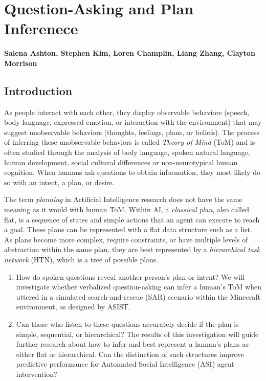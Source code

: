 \chapter{Question-Asking and Plan Inferenece}
\label{ch:question_plan}
\textbf{Salena Ashton, Stephen Kim, Loren Champlin, Liang Zhang, Clayton Morrison}

\section{Introduction}

As people interact with each other, they display observable behaviors (speech,
body language, expressed emotion, or interaction with the environment) that may
suggest unobservable behaviors (thoughts, feelings, plans, or beliefs). The
process of inferring these unobservable behaviors is called \textit{Theory of
Mind} (ToM) and is often studied through the analysis of body language, spoken natural language, human development, social cultural differences or non-neurotypical human cognition. When humans ask questions to obtain information, they most likely do so with an intent, a plan, or desire.

The term \textit{planning} in Artificial Intelligence research does not have
the same meaning as it would with human ToM. Within AI, a \textit{classical
plan}, also called flat, is a sequence of states and simple actions that an
agent can execute to reach a goal. These plans can be represented with a flat
data structure such as a list. As plans become more complex, require
constraints, or have multiple levels of abstraction within the same plan, they
are best represented by a \textit{hierarchical task network} (HTN), which is a tree of possible plans.
\vspace{15pt}

\begin{enumerate}
    \item How do spoken questions reveal another person’s plan or intent? We will investigate whether verbalized question-asking can infer a human’s ToM
when uttered in a simulated search-and-rescue (SAR) scenario within the
Minecraft environment, as designed by ASIST.
    \item Can those who listen to these questions accurately decide if the plan is simple, sequential, or hierarchical? The results of this investigation will guide further research about how to
infer and best represent a human's plans as either flat or hierarchical. Can
the distinction of such structures improve predictive performance for Automated
Social Intelligence (ASI) agent intervention?
\end{enumerate}

